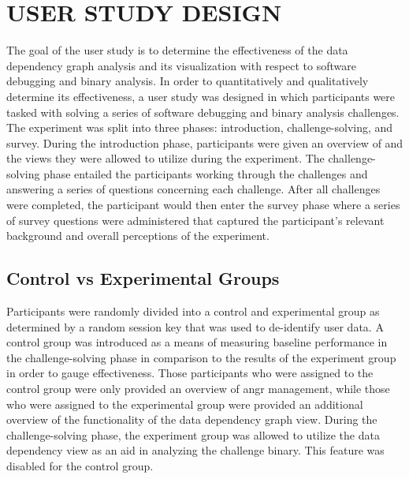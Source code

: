 \chapter{USER STUDY DESIGN}
The goal of the user study is to determine the effectiveness of the data dependency graph analysis and its  visualization with respect to software debugging and binary analysis. In order to quantitatively and qualitatively determine its effectiveness, a user study was designed in which participants were tasked with solving a series of software debugging and binary analysis challenges. The experiment was split into three phases: introduction, challenge-solving, and survey. During the introduction phase, participants were given an overview of  and the views they were allowed to utilize during the experiment. The challenge-solving phase entailed the participants working through the challenges and answering a series of questions concerning each challenge. After all challenges were completed, the participant would then enter the survey phase where a series of survey questions were administered that captured the participant’s relevant background and overall perceptions of the experiment.

\section{Control vs Experimental Groups}
Participants were randomly divided into a control and experimental group as determined by a random session key that was used to de-identify user data. A control group was introduced as a means of measuring baseline performance in the challenge-solving phase in comparison to the results of the experiment group in order to gauge effectiveness. Those participants who were assigned to the control group were only provided an overview of angr management, while those who were assigned to the experimental group were provided an additional overview of the functionality of the data dependency graph view. During the challenge-solving phase, the experiment group was allowed to utilize the data dependency view as an aid in analyzing the challenge binary. This feature was disabled for the control group.

